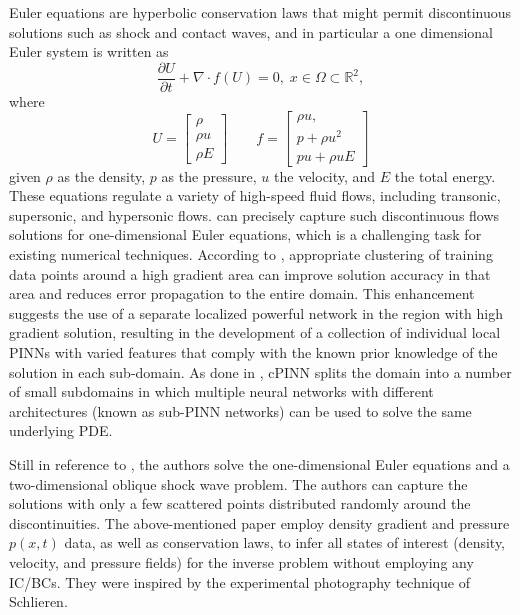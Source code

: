 \documentclass[pdflatex,sn-basic]{sn-jnl}%
\theoremstyle{thmstyleone}%
\theoremstyle{thmstyletwo}%
\theoremstyle{thmstylethree}%
\begin{document}
Euler equations are hyperbolic conservation laws that might permit discontinuous solutions such as shock and contact waves, and in particular a one dimensional Euler system is written as \citep{Jag2020_ConservativePhysicsInformed_KhaJKK}
\begin{equation*}
   \frac{\partial U}{\partial t} + \nabla\cdot {f}(U) = 0, \; x\in \Omega\subset \mathbb{R}^2,
\end{equation*}
where
\begin{equation*}
U = \begin{bmatrix}
           \rho \\
           \rho u \\
           \rho E
         \end{bmatrix}
\qquad
f = \begin{bmatrix}
           \rho u, \\
           p+ \rho u^2 \\
           p u + \rho u E
         \end{bmatrix}
\end{equation*}
given $\rho$ as the density, $p$ as the pressure,  $u$  the velocity, and $E$ the total energy. These equations regulate a variety of high-speed fluid flows, including transonic, supersonic, and hypersonic flows. \cite{Mao2020_PhysicsInformedNeural_JagMJK} can precisely capture such discontinuous flows solutions for one-dimensional Euler equations, which is a challenging task for existing numerical techniques. 
According to \cite{Mao2020_PhysicsInformedNeural_JagMJK}, appropriate clustering of training data points around a high gradient area can improve solution accuracy in that area and reduces error propagation to the entire domain. This enhancement suggests the use of a separate localized powerful network in the region with high gradient solution, resulting in the development of a collection of individual local PINNs with varied features that comply with the known prior knowledge of the solution in each sub-domain. 
As done in \cite{Jag2020_ConservativePhysicsInformed_KhaJKK}, cPINN splits  the domain into a number of small subdomains in which multiple neural networks with different architectures (known as sub-PINN networks) can be used to solve the same underlying PDE. 

Still in reference to \cite{Mao2020_PhysicsInformedNeural_JagMJK}, the authors solve the one-dimensional Euler equations and a two-dimensional oblique shock wave problem. The authors can capture the solutions with only a few scattered points distributed randomly around the discontinuities.
The above-mentioned paper employ density gradient and pressure $p(x, t)$ data, as well as conservation laws, to infer all states of interest (density, velocity, and pressure fields) for the inverse problem without employing any IC/BCs. They were inspired by the experimental photography technique of Schlieren.
\end{document}
